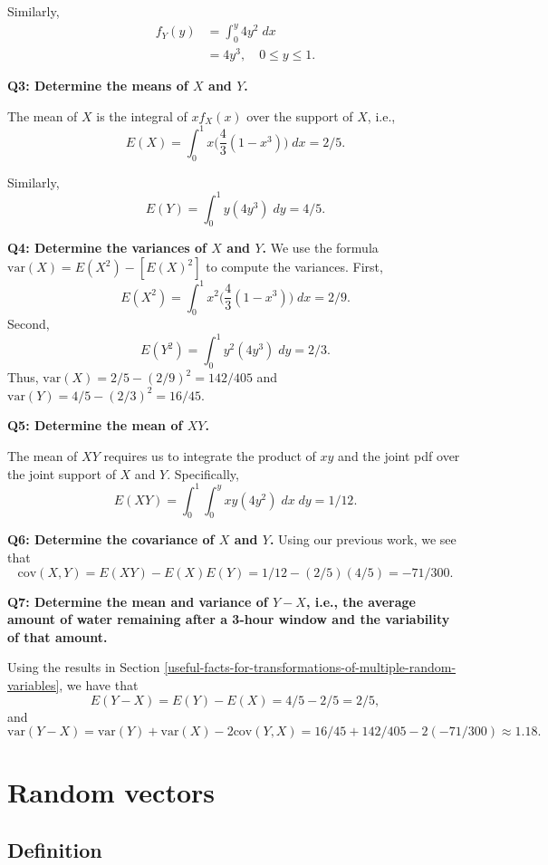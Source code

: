 \documentclass[
]{book}
\theoremstyle{definition}
\theoremstyle{definition}
\theoremstyle{definition}
\theoremstyle{definition}
\theoremstyle{remark}
\begin{document}
Similarly,
\[
\begin{aligned}
f_Y(y) &=\int_{0}^y 4y^2\;dx \\
&=4y^3,\quad 0\leq y \leq 1.
\end{aligned}
\]

\textbf{Q3: Determine the means of \(X\) and \(Y\).}

The mean of \(X\) is the integral of \(x f_X(x)\) over the support of \(X\), i.e.,
\[
E(X) =\int_{0}^1 x\biggl(\frac{4}{3}(1-x^3)\biggr)\;dx = 2/5.
\]

Similarly,
\[
E(Y) =\int_{0}^1 y(4y^3)\;dy = 4/5.
\]

\textbf{Q4: Determine the variances of \(X\) and \(Y\).}
We use the formula \(\mathrm{var}(X)=E(X^2)-[E(X)^2]\) to compute the variances. First,
\[
E(X^2) =\int_{0}^1 x^2\biggl(\frac{4}{3}(1-x^3)\biggr)\;dx = 2/9.
\]
Second,
\[
E(Y^2) =\int_{0}^1 y^2(4y^3)\;dy = 2/3.
\]
Thus, \(\mathrm{var}(X)=2/5-(2/9)^2=142/405\) and \(\mathrm{var}(Y)=4/5-(2/3)^2=16/45\).

\textbf{Q5: Determine the mean of \(XY\).}

The mean of \(XY\) requires us to integrate the product of \(xy\) and the joint pdf over the joint support of \(X\) and \(Y\). Specifically,
\[
E(XY)=\int_{0}^{1}\int_{0}^{y} xy(4y^2)\;dx\;dy= 1/12.
\]

\textbf{Q6: Determine the covariance of \(X\) and \(Y\).}
Using our previous work, we see that
\[
\mathrm{cov}(X,Y)=E(XY) - E(X)E(Y)=1/12-(2/5)(4/5)=-71/300.
\]

\textbf{Q7: Determine the mean and variance of \(Y-X\), i.e., the average amount of water remaining after a 3-hour window and the variability of that amount.}

Using the results in Section \ref{useful-facts-for-transformations-of-multiple-random-variables}, we have that
\[E(Y-X)=E(Y)-E(X)=4/5-2/5=2/5,\]
and
\[
\mathrm{var}(Y-X)=\mathrm{var}(Y)+\mathrm{var}(X)-2\mathrm{cov}(Y,X)=
16/45+142/405-2(-71/300)\approx 1.18.
\]

\hypertarget{random-vectors}{%
\section{Random vectors}\label{random-vectors}}

\hypertarget{definition}{%
\subsection{Definition}\label{definition}}
\end{document}
